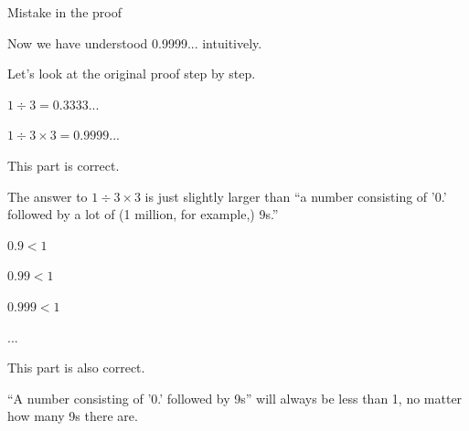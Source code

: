 %
%


\begin{frame}[c]{}{}
  {\large Mistake in the proof}
\end{frame}

\begin{frame}[c]{}{}
  Now we have understood 0.9999... intuitively.

  \vspace{4ex}

  Let's look at the original proof step by step.
\end{frame}

\begin{frame}[c]{}{}
  $1 \div 3 = 0.3333...$

  $1 \div 3 \times 3 = 0.9999...$

  \vspace{2ex}

  This part is correct.

  \vspace{2ex}

  The answer to $1 \div 3 \times 3$ is just slightly larger than ``a number consisting of '0.' followed by a lot of (1 million, for example,) 9s.''
\end{frame}

\begin{frame}[c]{}{}
  $0.9 < 1$

  $0.99 < 1$

  $0.999 < 1$

  ...

  \vspace{2ex}

  This part is also correct.

  \vspace{2ex}

  ``A number consisting of '0.' followed by 9s'' will always be less than 1, no matter how many 9s there are.
\end{frame}

